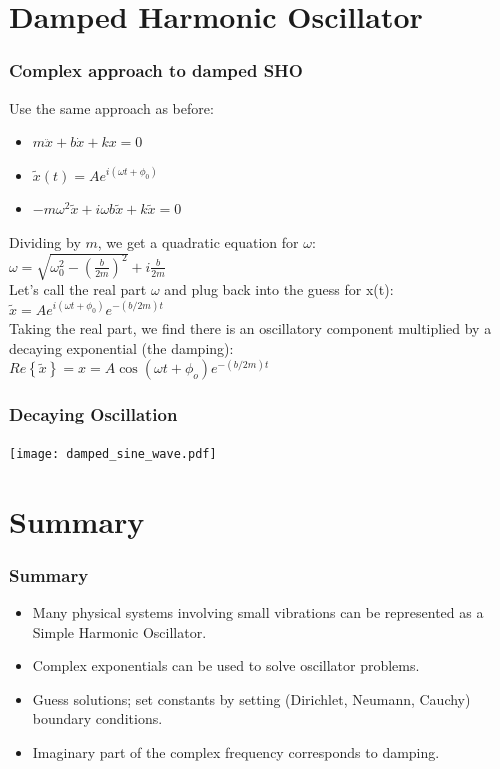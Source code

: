\documentclass[pdf,hideothersubsections]{beamer}
\begin{document}
\section{Damped Harmonic Oscillator}
\begin{frame}
\frametitle{Complex approach to damped SHO}
Use the same approach as before:
\begin{itemize}
\item $m \ddot{x} + b \dot{x} + k x = 0$
\pause
\item $\tilde{x}(t) = A e^{i (\omega t + \phi_0)}$
\pause
\item $-m \omega^2 \tilde{x} + i \omega b \tilde{x} + k \tilde{x} = 0$
\end{itemize}
\pause
Dividing by $m$, we get a quadratic equation for $\omega$: \\
\pause
$\omega = \sqrt{\omega_0^2 - (\frac{b}{2 m})^2} + i \frac{b}{2 m}$ \\
\pause
Let's call the real part $\omega$ and plug back into the guess for x(t):
\pause
$\tilde{x} = A e^{i (\omega t + \phi_0)} e^{-(b/2 m) t}$\\
\pause
Taking the real part, we find there is an oscillatory component multiplied by a decaying exponential (the damping): \\
\pause
$Re\left\{\tilde{x}\right\} = x = A \cos(\omega t + \phi_o) e^{-(b/2 m) t}$

\end{frame}

\begin{frame}
\frametitle{Decaying Oscillation}

\centering
\texttt{[image: damped\_sine\_wave.pdf]}

\end{frame}

\section{Summary}
\begin{frame}
\frametitle{Summary}
\begin{itemize}
\item Many physical systems involving small vibrations can be represented as a Simple Harmonic Oscillator.
\pause
\item Complex exponentials can be used to solve oscillator problems.
\pause
\item Guess solutions; set constants by setting (Dirichlet, Neumann, Cauchy) boundary conditions.
\pause
\item Imaginary part of the complex frequency corresponds to damping.
\end{itemize}
\end{frame}
\end{document}
